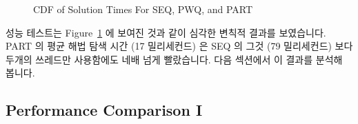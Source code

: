 \begin{figure}[tb]
\centering
{}
\caption{CDF of Solution Times For SEQ, PWQ, and PART}
\label{fig:SMPdesign:CDF of Solution Times For SEQ, PWQ, and PART}
\end{figure}

성능 테스트는
Figure~\ref{fig:SMPdesign:CDF of Solution Times For SEQ, PWQ, and PART} 에
보여진 것과 같이 심각한 변칙적 결과를 보였습니다.
PART 의 평균 해법 탐색 시간 (17 밀리세컨드) 은 SEQ 의 그것 (79 밀리세컨드) 보다
두개의 쓰레드만 사용함에도 네배 넘게 빨랐습니다.
다음 섹션에서 이 결과를 분석해 봅니다.

\subsection{Performance Comparison I}
\label{sec:SMPdesign:Performance Comparison I}

